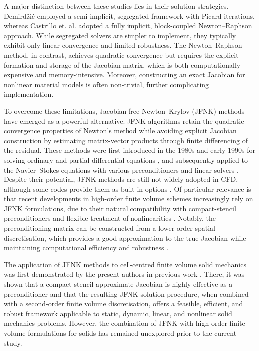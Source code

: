 \documentclass[sn-mathphys,Numbered]{sn-jnl}%
\begin{document}
A major distinction between these studies lies in their solution strategies. Demirdžić \cite{Demirdzic2016} employed a semi-implicit, segregated framework with Picard iterations, whereas Castrillo et. al. \cite{Castrillo2022,Castrillo2024} adopted a fully implicit, block-coupled Newton–Raphson approach. While segregated solvers are simpler to implement, they typically exhibit only linear convergence and limited robustness. The Newton–Raphson method, in contrast, achieves quadratic convergence but requires the explicit formation and storage of the Jacobian matrix, which is both computationally expensive and memory-intensive. Moreover, constructing an exact Jacobian for nonlinear material models is often non-trivial, further complicating implementation. 

To overcome these limitations, Jacobian-free Newton–Krylov (JFNK) methods have emerged as a powerful alternative. JFNK algorithms retain the quadratic convergence properties of Newton’s method while avoiding explicit Jacobian construction by estimating matrix-vector products through finite differencing of the residual. These methods were first introduced in the 1980s and early 1990s for solving ordinary and partial differential equations \citep{Gear1983, Chan1984, Brown1986, Brown1990}, and subsequently applied to the Navier–Stokes equations with various preconditioners and linear solvers  \cite{Qin2000, Geuzaine2001, Pernice2001, Nejat2008}. Despite their potential, JFNK methods are still not widely adopted in CFD, although some codes provide them as built-in options \cite{Nakashima2025}. Of particular relevance is that recent developments in high-order finite volume schemes increasingly rely on JFNK formulations, due to their natural compatibility with compact-stencil preconditioners and flexible treatment of nonlinearities \cite{Nishikawa2025}. Notably, the preconditioning matrix can be constructed from a lower-order spatial discretisation, which provides a good approximation to the true Jacobian while maintaining computational efficiency and robustness \cite{Mchugh1994, Qin2000, Geuzaine2001, Pernice2001, Knoll2004, Vaassen2008, Lucas2010, Nejat2008, Nishikawa2020}. 

The application of JFNK methods to cell-centred finite volume solid mechanics was first demonstrated by the present authors in previous work \cite{Cardiff2025}. There, it was shown that a compact-stencil approximate Jacobian is highly effective as a preconditioner and that the resulting JFNK solution procedure, when combined with a second-order finite volume discretisation, offers a feasible, efficient, and robust framework applicable to static, dynamic, linear, and nonlinear solid mechanics problems. However, the combination of JFNK with high-order finite volume formulations for solids has remained unexplored prior to the current study.
\end{document}
